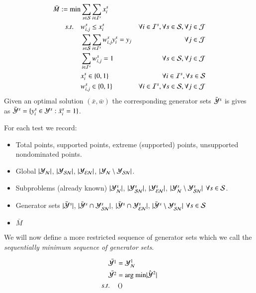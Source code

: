 \begin{enumerate}
\begin{align*}
	\bar{M}  := \min&  \sum_{s \in \S}\sum_{i \in \I^s} x^s_i \\
	s.t. \quad & w^s_{i,j} \le x^s_i & \forall i \in \I^s, \forall s \in \S, \forall j \in \J \\
		   &\sum_{s \in \S}\sum_{i \in \I^s} w^s_{i,j} y^s_i = y_j & \quad \forall j \in \J \\
		   &\sum_{i \in \I^s} w^s_{i,j} = 1 & \quad \forall s \in \S, \forall j \in \J  \\
		   & x^s_i \in \{0,1\} & \forall i \in \I^s, \forall s \in \S\\
		   & w^s_{i,j} \in \{0,1\} &\forall i \in \I^s, \forall s \in \S, \forall j \in \J \nonumber
\end{align*}
Given an optimal solution $(\bar{x},\bar{w})$ the corresponding generator sets $\Ycs$ is gives as $\Ycs = \{ y^s_i \in \Y^s : \bar{x}^s_i = 1\}$.

For each test we record:
\begin{itemize}
	\item Total points, supported points, extreme (supported) points, unsupported nondominated points.
	\item Global $\lvert \Yn \rvert$, $\lvert \Ysn \rvert$,  $\lvert \Yen \rvert$, $\lvert \Yn \setminus \Ysn \rvert$.
	\item Subproblems (already known)  $\lvert \Yn^s \rvert$, $\lvert \Ysn^s \rvert$,  $\lvert \Yen^s \rvert$, $\lvert \Yn^s \setminus \Ysn^s \rvert$ $\forall s \in \S$.
	\item Generator sets $\lvert \Ycs \rvert$, $\lvert \Ycs \cap \Ysn^s \rvert$, $\lvert \Ycs \cap \Yen^s \rvert$,  $\lvert \Ycs \setminus \Ysn^s \rvert$  $\forall s \in \S$
	\item $\bar{M}$
\end{itemize}



We will now define a more restricted sequence of generator sets which we call the \emph{sequentially minimum sequence of generator sets}. 

\begin{align}
    \bar{\Y^1}  &= \Yn^1 \\
    \bar{\Y^2}  &= \text{arg min} \lvert \hY^2 \rvert \\ 
    s.t. \quad& \left( \right)
\end{align}





\end{enumerate}




